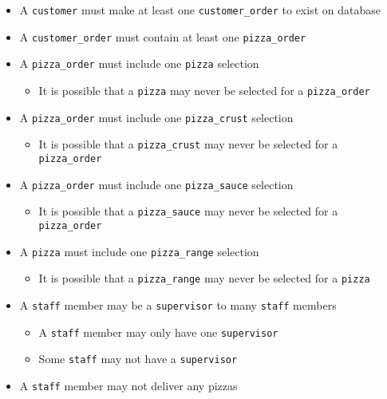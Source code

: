 \begin{itemize}
\item A \texttt{customer} must make at least one \texttt{customer_order} to exist on database
\item A \texttt{customer_order} must contain at least one \texttt{pizza_order}
\item A \texttt{pizza_order} must include one \texttt{pizza} selection
	\begin{itemize}
	\item It is possible that a \texttt{pizza} may never be selected for a \texttt{pizza_order}
	\end{itemize}
\item A \texttt{pizza_order} must include one \texttt{pizza_crust} selection
	\begin{itemize}
	\item It is possible that a \texttt{pizza_crust} may never be selected for a \texttt{pizza_order}
	\end{itemize}
\item A \texttt{pizza_order} must include one \texttt{pizza_sauce} selection
	\begin{itemize}
	\item It is possible that a \texttt{pizza_sauce} may never be selected for a \texttt{pizza_order}
	\end{itemize}
\item A \texttt{pizza} must include one \texttt{pizza_range} selection
	\begin{itemize}
	\item It is possible that a \texttt{pizza_range} may never be selected for a \texttt{pizza}
	\end{itemize}
\item A \texttt{staff} member may be a \texttt{supervisor} to many \texttt{staff} members
	\begin{itemize}
	\item A \texttt{staff} member may only have one \texttt{supervisor}
	\item Some \texttt{staff} may not have a \texttt{supervisor}
	\end{itemize}
\item A \texttt{staff} member may not deliver any pizzas
\end{itemize}

